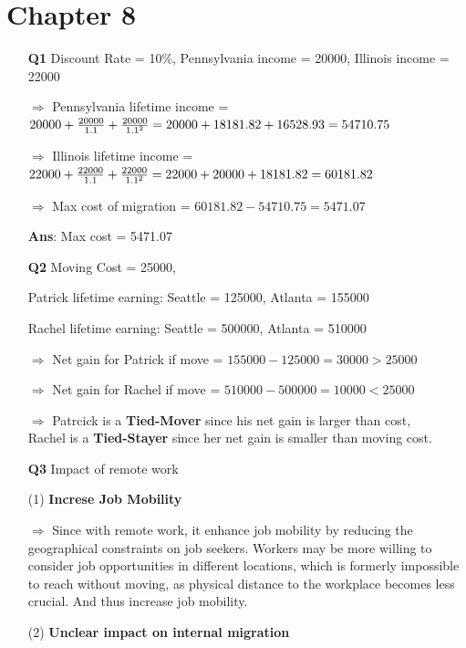 \documentclass[12pt]{article}
\begin{document}
\section{Chapter 8}
\begin{enumerate}
    \item [\textbf{Q1}]
    Discount Rate = 10\%, Pennsylvania income = 20000, Illinois income = 22000

    $\Rightarrow$ Pennsylvania lifetime income = $20000 + \frac{20000}{1.1} + \frac{20000}{1.1^2} = 20000 + 18181.82 + 16528.93 \\= 54710.75$

    $\Rightarrow$ Illinois lifetime income = $22000 + \frac{22000}{1.1} + \frac{22000}{1.1^2} = 22000 + 20000 + 18181.82\\ = 60181.82$

    $\Rightarrow$ Max cost of migration = $60181.82 - 54710.75 = 5471.07$

    \textbf{Ans}: Max cost = 5471.07
    \newpage

    \item [\textbf{Q2}]
    Moving Cost = 25000, 

    Patrick lifetime earning: Seattle = 125000, Atlanta = 155000

    Rachel lifetime earning: Seattle = 500000, Atlanta = 510000

    $\Rightarrow$ Net gain for Patrick if move = $155000 - 125000 = 30000 > 25000$

    $\Rightarrow$ Net gain for Rachel if move = $510000 - 500000 = 10000 < 25000$

    $\Rightarrow$ Patrcick is a \textbf{Tied-Mover} since his net gain is larger than cost,\\ Rachel is a \textbf{Tied-Stayer} since her net gain is smaller than moving cost.

    \item [\textbf{Q3}] Impact of remote work

    (1) \textbf{Increse Job  Mobility}

    $\Rightarrow$ Since with remote work, it enhance job mobility by reducing the geographical constraints on job seekers. 
    Workers may be more willing to consider job opportunities in different locations, which is formerly impossible to reach without moving, 
    as physical distance to the workplace becomes less crucial. And thus increase job mobility.

    (2) \textbf{Unclear impact on internal migration}


\end{enumerate}
\end{document}
